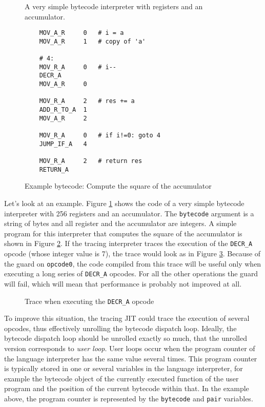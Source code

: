 \documentclass{acm_proc_article-sp}
\begin{document}
\begin{figure}

\caption{A very simple bytecode interpreter with registers and an accumulator.}
\label{fig:tlr-basic}
\end{figure}

\begin{figure}
\begin{verbatim}
    MOV_A_R     0   # i = a
    MOV_A_R     1   # copy of 'a'
    
    # 4:
    MOV_R_A     0   # i--
    DECR_A
    MOV_A_R     0    

    MOV_R_A     2   # res += a
    ADD_R_TO_A  1
    MOV_A_R     2
    
    MOV_R_A     0   # if i!=0: goto 4
    JUMP_IF_A   4

    MOV_R_A     2   # return res
    RETURN_A
\end{verbatim}
\caption{Example bytecode: Compute the square of the accumulator}
\label{fig:square}
\end{figure}

Let's look at an example. Figure \ref{fig:tlr-basic} shows the code of a very
simple bytecode interpreter with 256 registers and an accumulator. The
\texttt{bytecode} argument is a string of bytes and all register and the
accumulator are integers. A simple program for this interpreter that computes
the square of the accumulator is shown in Figure \ref{fig:square}. If the
tracing interpreter traces the execution of the \texttt{DECR\_A} opcode (whose
integer value is 7), the trace would look as in Figure \ref{fig:trace-normal}.
Because of the guard on \texttt{opcode0}, the code compiled from this trace will
be useful only when executing a long series of \texttt{DECR\_A} opcodes. For all
the other operations the guard will fail, which will mean that performance is
probably not improved at all.

\begin{figure}

\caption{Trace when executing the \texttt{DECR\_A} opcode}
\label{fig:trace-normal}
\end{figure}

To improve this situation, the tracing JIT could trace the execution of several
opcodes, thus effectively unrolling the bytecode dispatch loop. Ideally, the
bytecode dispatch loop should be unrolled exactly so much, that the unrolled version
corresponds to \emph{user loop}. User loops
occur when the program counter of the language interpreter has the
same value several times. This program counter is typically stored in one or several
variables in the language interpreter, for example the bytecode object of the
currently executed function of the user program and the position of the current
bytecode within that.  In the example above, the program counter is represented by 
the \texttt{bytecode} and \texttt{pair} variables.
\end{document}

